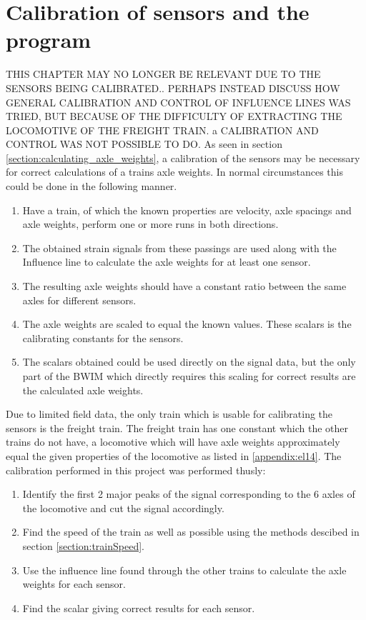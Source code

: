 \section{Calibration of sensors and the program}
\label{calibration}
THIS CHAPTER MAY NO LONGER BE RELEVANT DUE TO THE SENSORS BEING CALIBRATED..
PERHAPS INSTEAD DISCUSS HOW GENERAL CALIBRATION AND CONTROL OF INFLUENCE LINES WAS TRIED, BUT BECAUSE OF THE DIFFICULTY OF EXTRACTING THE LOCOMOTIVE OF THE FREIGHT TRAIN. a CALIBRATION AND CONTROL WAS NOT POSSIBLE TO DO.
As seen in section \ref{section:calculating_axle_weights}, a calibration of the sensors may be necessary for correct calculations of a trains axle weights. In normal circumstances this could be done in the following manner.
\begin{enumerate}
	\item Have a train, of which the known properties are velocity, axle spacings and axle weights, perform one or more runs in both directions.
	\item The obtained strain signals from these passings are used along with the Influence line to calculate the axle weights for at least one sensor.
	\item The resulting axle weights should have a constant ratio between the same axles for different sensors.
	\item The axle weights are scaled to equal the known values. These scalars is the calibrating constants for the sensors.
	\item The scalars obtained could be used directly on the signal data, but the only part of the BWIM which directly requires this scaling for correct results are the calculated axle weights.
\end{enumerate}
Due to limited field data, the only train which is usable for calibrating the sensors is the freight train. The freight train has one constant which the other trains do not have, a locomotive which will have axle weights approximately equal the given properties of the locomotive as listed in \ref{appendix:el14}. The calibration performed in this project was performed thusly:
\begin{enumerate}
	\item Identify the first 2 major peaks of the signal corresponding to the 6 axles of the locomotive and cut the signal accordingly.
	\item Find the speed of the train as well as possible using the methods descibed in section \ref{section:trainSpeed}.
	\item Use the influence line found through the other trains to calculate the axle weights for each sensor.
	\item Find the scalar giving correct results for each sensor.
\end{enumerate}
